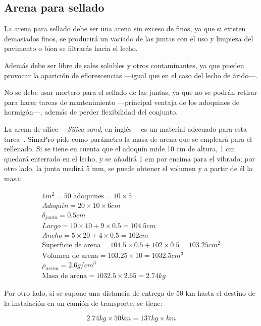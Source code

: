 \subsection{Arena para sellado}

La arena para sellado debe ser una arena sin exceso de finos, ya que si existen demasiados finos, se producirá un vaciado de las juntas con el uso y limpieza del pavimento o bien se filtrarás hacia el lecho.

Además debe ser libre de sales solubles y otros contaminantes, ya que pueden provocar la aparición de eflorescencias —igual que en el caso del lecho de árido—.

No se debe usar mortero para el sellado de las juntas, ya que no se podrán retirar para hacer tareas de mantenimiento —principal ventaja de los adoquines de hormigón—, además de perder flexibilidad del conjunto.

La arena de sílice —\textit{Silica sand}, en inglés— es un material adecuado para esta tarea \cite{website:ecoinvent}. SimaPro pide como parámetro la masa de arena que se empleará para el rellenado. Si se tiene en cuenta que el adoquín mide 10 \si{cm} de altura, 1 \si{cm} quedará enterrado en el lecho, y se añadirá 1 \si{cm} por encima para el vibrado; por otro lado, la junta medirá 5 \si{mm}, se puede obtener el volumen y a partir de él la masa:

\begin{gather}
1 m^2 = 50 \text{ adoquines} = 10 \times 5\\
Adoquin = 20 \times 10 \times 6 cm\\
\delta_{junta} = 0.5cm\\
Largo = 10 \times 10 + 9 \times 0.5 = 104.5 cm\\
Ancho = 5 \times 20 + 4 \times 0.5 = 102 cm\\
\text{Superficie de arena} = 104.5 \times 0.5 + 102 \times 0.5 = 103.25 cm^2\\
\text{Volumen de arena} = 103.25 \times 10 = 1032.5 cm^3\\
\rho_{arena}=2.6 g/cm^3\\
\text{Masa de arena} = 1032.5 \times 2.65 = 2.74 kg
\end{gather}

Por otro lado, si se supone una distancia de entrega de 50 km hasta el destino de la instalación en un camión de transporte, se tiene:

\begin{equation}
2.74 kg \times 50 km = 137 kg \times km
\end{equation}

